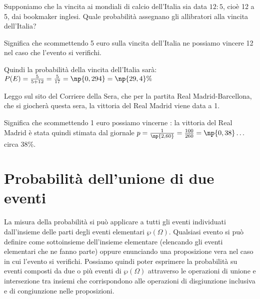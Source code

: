 \begin{exrig}
\begin{esempio}
Supponiamo che la vincita ai mondiali di calcio dell'Italia sia data $12:5$, cioè 12 a 5, dai bookmaker inglesi. Quale probabilità assegnano gli allibratori alla vincita dell'Italia?

Significa che scommettendo 5 euro sulla vincita dell'Italia ne possiamo vincere 12 nel caso che l'evento si verifichi.

Quindi la probabilità della vincita dell'Italia sarà:
$P(E)=\frac 5{5+12}=\frac 5{17}=\np{0,294}=\np{29,4}\%$
\end{esempio}

\begin{esempio}
Leggo sul sito del Corriere della Sera, che per la partita Real Madrid-Barcellona, che si giocherà questa sera, la vittoria del Real Madrid viene data  a 1.

Significa che scommettendo 1 euro possiamo vincerne : la vittoria del Real Madrid è stata quindi stimata dal giornale $p=\frac 1{\np{2,60}}=\frac{100}{260}=\np{0,38}\ldots$ circa 38\%.
\end{esempio}
\end{exrig}
\ovalbox{\risolvii \ref{ese:9.5}, \ref{ese:9.6}, \ref{ese:9.7}, \ref{ese:9.8}, \ref{ese:9.9}, \ref{ese:9.10}, \ref{ese:9.11}, \ref{ese:9.12}, \ref{ese:9.13}, \ref{ese:9.14}, \ref{ese:9.15}, \ref{ese:9.16}, \ref{ese:9.17},}

\vspazio\ovalbox{ \ref{ese:9.18}, \ref{ese:9.19}, \ref{ese:9.20}, \ref{ese:9.21}, \ref{ese:9.22}, \ref{ese:9.23}, \ref{ese:9.24}, \ref{ese:9.25}, \ref{ese:9.26}}

\section{Probabilità dell'unione di due eventi}

La misura della probabilità si può applicare a tutti gli eventi individuati dall'insieme delle parti degli eventi elementari $\wp(\Omega)$. Qualsiasi evento si può definire come sottoinsieme dell'insieme elementare (elencando gli eventi elementari che ne fanno parte) oppure enunciando una proposizione vera nel caso in cui l'evento si verifichi. Possiamo quindi poter esprimere la probabilità su eventi composti da due o più eventi di $\wp(\Omega)$ attraverso le operazioni di unione e intersezione tra insiemi che corrispondono alle operazioni di disgiunzione inclusiva e di congiunzione nelle proposizioni.

